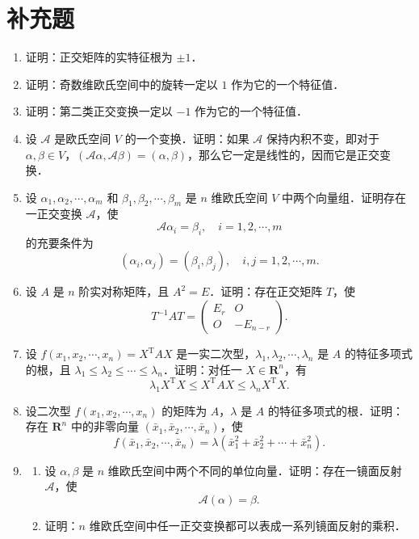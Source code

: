 \section{补充题}

\begin{enumerate}
  \item 证明：正交矩阵的实特征根为 $\pm 1$．

  \ansproof
  \item 证明：奇数维欧氏空间中的旋转一定以 $1$ 作为它的一个特征值．

  \ansproof
  \item 证明：第二类正交变换一定以 $-1$ 作为它的一个特征值．

  \ansproof
  \item 设 $\mathcal{A}$ 是欧氏空间 $V$ 的一个变换．证明：如果 $\mathcal{A}$ 保持内积不变，即对于 $\alpha,\beta\in V$，$(\mathcal{A}\alpha,\mathcal{A}\beta)=(\alpha,\beta)$，那么它一定是线性的，因而它是正交变换．

  \ansproof
  \item 设 $\alpha_1,\alpha_2,\cdots,\alpha_m$ 和 $\beta_1,\beta_2,\cdots,\beta_m$ 是 $n$ 维欧氏空间 $V$ 中两个向量组．证明存在一正交变换 $\mathcal{A}$，使
  \[
  \mathcal{A}\alpha_i=\beta_i,\quad i=1,2,\cdots,m
  \]
  的充要条件为
  \[
  (\alpha_i,\alpha_j)=(\beta_i,\beta_j),\quad i,j=1,2,\cdots,m.
  \]

  \ansproof
  \item 设 $A$ 是 $n$ 阶实对称矩阵，且 $A^2=E$．证明：存在正交矩阵 $T$，使
  \[
  T^{-1}AT=\begin{pmatrix}
    E_r & O \\
    O & -E_{n-r}
  \end{pmatrix}.
  \]

  \ansproof
  \item 设 $f(x_1,x_2,\cdots,x_n)=X^{\mathrm{T}}AX$ 是一实二次型，$\lambda_1,\lambda_2,\cdots,\lambda_n$ 是 $A$ 的特征多项式的根，且 $\lambda_1\le\lambda_2\le\cdots\le\lambda_n$．证明：对任一 $X\in\mathbf{R}^n$，有
  \[
  \lambda_1X^{\mathrm{T}}X\le X^{\mathrm{T}}AX\le\lambda_nX^{\mathrm{T}}X.
  \]

  \ansproof
  \item 设二次型 $f(x_1,x_2,\cdots,x_n)$ 的矩阵为 $A$，$\lambda$ 是 $A$ 的特征多项式的根．证明：存在 $\mathbf{R}^n$ 中的非零向量 $(\bar{x}_1,\bar{x}_2,\cdots,\bar{x}_n)$，使
  \[
  f(\bar{x}_1,\bar{x}_2,\cdots,\bar{x}_n)=\lambda(\bar{x}_1^2+\bar{x}_2^2+\cdots+\bar{x}_n^2).
  \]

  \ansproof
  \item
  \begin{enumerate}
    \item 设 $\alpha,\beta$ 是 $n$ 维欧氏空间中两个不同的单位向量．证明：存在一镜面反射 $\mathcal{A}$，使
    \[
    \mathcal{A}(\alpha)=\beta.
    \]
  \anssub
    \item 证明：$n$ 维欧氏空间中任一正交变换都可以表成一系列镜面反射的乘积．
  \anssub
  \end{enumerate}


\end{enumerate}
